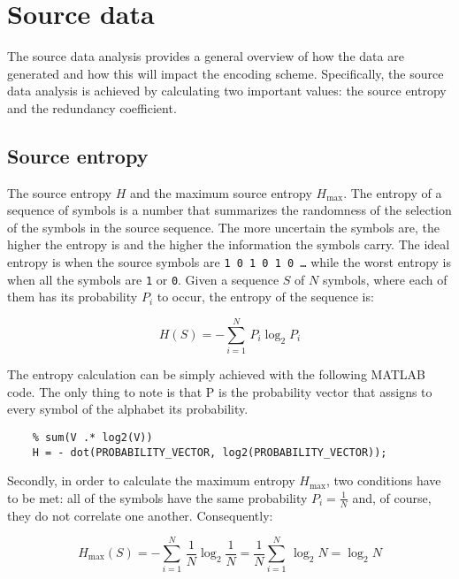 \section{Source data}

The source data analysis provides a general overview of how the data are generated and how this will impact the encoding scheme. Specifically, the source data analysis is achieved by calculating two important values: the source entropy and the redundancy coefficient.

\subsection{Source entropy}

The source entropy $H$ and the maximum source entropy $H_{\max}$. The entropy of a sequence of symbols is a number that summarizes the randomness of the selection of the symbols in the source sequence. The more uncertain the symbols are, the higher the entropy is and the higher the information the symbols carry. The ideal entropy is when the source symbols are \texttt{1 0 1 0 1 0 \dots} while the worst entropy is when all the symbols are \texttt{1} or \texttt{0}. Given a sequence $S$ of $N$ symbols, where each of them has its probability $P_i$ to occur, the entropy of the sequence is:

\begin{equation*}
    H(S) = - \sum_{i = 1}^{N}\,P_i \log_2 P_i
\end{equation*}

\noindent The entropy calculation can be simply achieved with the following MATLAB code. The only thing to note is that P is the probability vector that assigns to every symbol of the alphabet its probability. 

\begin{lstlisting}  
    % sum(V .* log2(V))
    H = - dot(PROBABILITY_VECTOR, log2(PROBABILITY_VECTOR));
\end{lstlisting}

\noindent Secondly, in order to calculate the maximum entropy $H_{\max}$, two conditions have to be met: all of the symbols have the same probability $P_i = \frac{1}{N}$ and, of course, they do not correlate one another. Consequently:

\begin{equation*}
    H_{\max}(S) = - \sum_{i = 1}^{N}\,\frac{1}{N} \log_2 \frac{1}{N} = \frac{1}{N} \sum_{i = 1}^{N}\, \log_2 N = \log_2N
\end{equation*}


